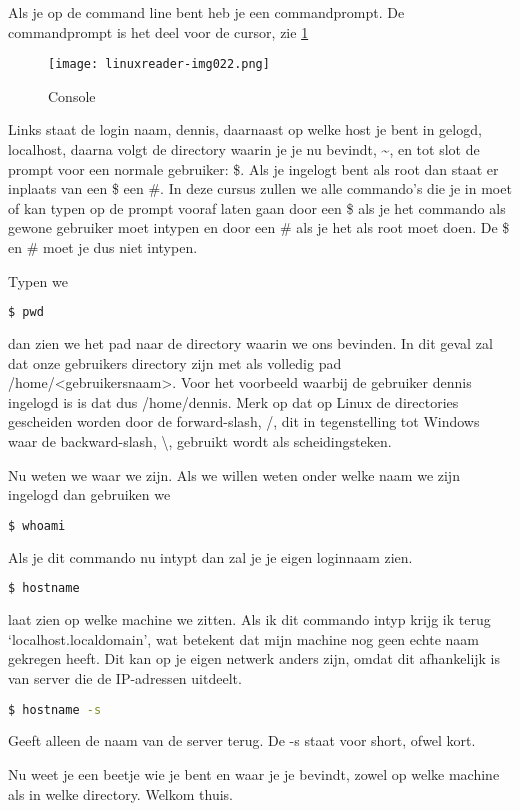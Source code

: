 Als je op de command line bent heb je een commandprompt. De commandprompt is het deel voor de cursor, zie \ref{fig:console}

\begin{figure}[h]
\texttt{[image: linuxreader-img022.png]}
	\label{fig:console}
	\caption{Console}
\end{figure}

Links staat de login naam, dennis, daarnaast op welke host je bent in gelogd, localhost, daarna volgt de directory
waarin je je nu bevindt, \~{}, en tot slot de prompt voor een normale gebruiker: \$. Als je ingelogt bent als root dan staat er inplaats van een \$ een \#. In deze cursus zullen we alle commando's die je in moet of kan typen op de prompt vooraf laten gaan door een \$ als je het commando als gewone gebruiker moet intypen en door een \# als je het als root moet doen. De \$ en \# moet je dus niet intypen.

Typen we
\begin{lstlisting}[language=bash]
$ pwd
\end{lstlisting}
dan zien we het pad naar de directory waarin we ons bevinden. In dit geval zal dat onze gebruikers
directory zijn met als volledig pad /home/{\textless}gebruikersnaam{\textgreater}. Voor het voorbeeld waarbij de
gebruiker dennis ingelogd is is dat dus /home/dennis. Merk op dat op Linux de directories gescheiden worden door de
forward-slash, /, dit in tegenstelling tot Windows waar de backward-slash, {\textbackslash}, gebruikt wordt als
scheidingsteken.

Nu weten we waar we zijn. Als we willen weten onder welke naam we zijn ingelogd dan gebruiken we
\begin{lstlisting}[language=bash]
$ whoami
\end{lstlisting}
Als je dit commando nu intypt dan zal je je eigen loginnaam zien.

\begin{lstlisting}[language=bash]
$ hostname
\end{lstlisting}
laat zien op welke machine we zitten. Als ik dit commando intyp krijg ik terug `localhost.localdomain', wat
betekent dat mijn machine nog geen echte naam gekregen heeft. Dit kan op je eigen netwerk anders zijn, omdat dit
afhankelijk is van server die de IP-adressen uitdeelt.

\begin{lstlisting}[language=bash]
$ hostname -s
\end{lstlisting}
Geeft alleen de naam van de server terug. De -s staat voor short, ofwel kort.

Nu weet je een beetje wie je bent en waar je je bevindt, zowel op welke machine als in welke directory. Welkom thuis.

